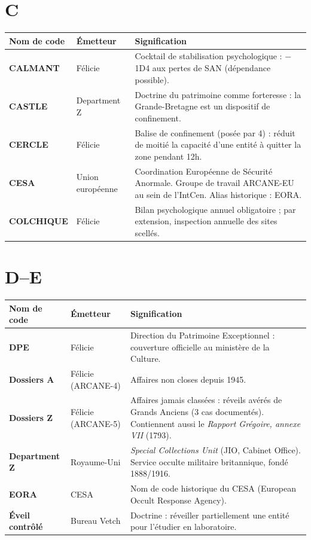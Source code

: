 \documentclass[10pt,a5paper,twoside]{book}
\begin{document}
\section*{C}

\begin{tabular}{|P{2.5cm}|P{2.5cm}|P{6.0cm}|}
\hline
\textbf{Nom de code} & \textbf{Émetteur} & \textbf{Signification} \\
\hline
\textbf{CALMANT} & Félicie & Cocktail de stabilisation psychologique : $-$1D4 aux pertes de SAN (dépendance possible). \\
\hline
\textbf{CASTLE} & Department Z & Doctrine du patrimoine comme forteresse : la Grande-Bretagne est un dispositif de confinement. \\
\hline
\textbf{CERCLE} & Félicie & Balise de confinement (posée par 4) : réduit de moitié la capacité d'une entité à quitter la zone pendant 12h. \\
\hline
\textbf{CESA} & Union européenne & Coordination Européenne de Sécurité Anormale. Groupe de travail ARCANE-EU au sein de l'IntCen. Alias historique : EORA. \\
\hline
\textbf{COLCHIQUE} & Félicie & Bilan psychologique annuel obligatoire ; par extension, inspection annuelle des sites scellés. \\
\hline
\end{tabular}

\clearpage

\section*{D--E}

\begin{tabular}{|P{2.5cm}|P{2.5cm}|P{6.0cm}|}
\hline
\textbf{Nom de code} & \textbf{Émetteur} & \textbf{Signification} \\
\hline
\textbf{DPE} & Félicie & Direction du Patrimoine Exceptionnel : couverture officielle au ministère de la Culture. \\
\hline
\textbf{Dossiers A} & Félicie (ARCANE-4) & Affaires non closes depuis 1945. \\
\hline
\textbf{Dossiers Z} & Félicie (ARCANE-5) & Affaires jamais classées : réveils avérés de Grands Anciens (3 cas documentés). Contiennent aussi le \textit{Rapport Grégoire, annexe VII} (1793). \\
\hline
\textbf{Department Z} & Royaume-Uni & \textit{Special Collections Unit} (JIO, Cabinet Office). Service occulte militaire britannique, fondé 1888/1916. \\
\hline
\textbf{EORA} & CESA & Nom de code historique du CESA (European Occult Response Agency). \\
\hline
\textbf{Éveil contrôlé} & Bureau Vetch & Doctrine : réveiller partiellement une entité pour l'étudier en laboratoire. \\
\hline
\end{tabular}
\end{document}
